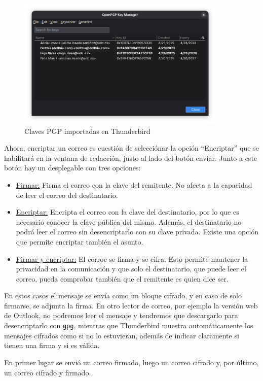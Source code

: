 \begin{figure}[H]
    \centering
    \includegraphics[width=10cm]{thunderbird-keymanager-keys.png}
    \caption{Claves PGP importadas en Thunderbird}
\end{figure}

Ahora, encriptar un correo es cuestión de selecciónar la opción “Encriptar” que se habilitará en la ventana de redacción, justo al lado del botón enviar. Junto a este botón hay un desplegable con tres opciones:
\begin{itemize}
    \item{\underline{Firmar:} Firma el correo con la clave del remitente. No afecta a la capacidad de leer el correo del destinatario.}
    \item{\underline{Encriptar:} Encripta el correo con la clave del destinatario, por lo que es necesario conocer la clave pública del mismo. Además, el destinatario no podrá leer el correo sin desencriptarlo con su clave privada. Existe una opción que permite encriptar también el asunto.}
    \item{\underline{Firmar y encriptar:} El corroe se firma y se cifra. Esto permite mantener la privacidad en la comunicación y que solo el destinatario, que puede leer el correo, pueda comprobar también que el remitente es quien dice ser.}
\end{itemize}

En estos casos el mensaje se envía como un bloque cifrado, y en caso de solo firmarse, se adjunta la firma. En otro lector de correo, por ejemplo la versión web de Outlook, no podremos leer el mensaje y tendremos que descargarlo para desencriptarlo con \texttt{gpg}, mientras que Thunderbird muestra automáticamente los mensajes cifrados como si no lo estuvieran, además de indicar claramente si tienen una firma y si es válida.

En primer lugar se envió un correo firmado, luego un correo cifrado y, por último, un correo cifrado y firmado.

